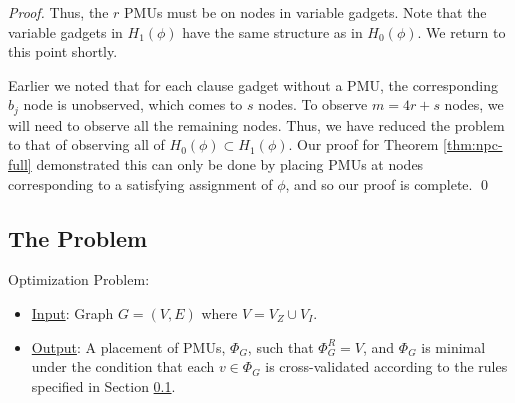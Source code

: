 \begin{proof}
Thus, the $r$ PMUs must be on nodes in variable gadgets. Note that the variable gadgets in $H_1(\phi)$ have the same structure as in $H_0(\phi)$. We return to this point shortly.

Earlier we noted that for each clause gadget without a PMU, the corresponding $b_j$ node is unobserved, which comes to $s$ nodes. To observe $m=4r+s$ nodes, we will need to observe all the remaining nodes. Thus, we have reduced the problem to that of observing all of $H_0(\phi)\subset H_1(\phi)$. Our proof for Theorem \ref{thm:npc-full} demonstrated this can only be done by placing PMUs at nodes corresponding to a satisfying assignment of $\phi$, and so our proof is complete. \qed
\end{proof}



\subsection{The \xval Problem}
\label{subsec:xval}


\xval Optimization Problem:
\begin{itemize}
	\item \underline{Input}: Graph $G=(V,E)$ where $V=V_Z \cup V_I$.

	\item \underline{Output}: A placement of PMUs, $\Phi_G$, such that $\Phi^R_G = V$,
	and  $\Phi_G$ is minimal under the condition that each $v \in \Phi_G$ is cross-validated according to the rules specified in Section \ref{subsec:xval}.
\end{itemize}

